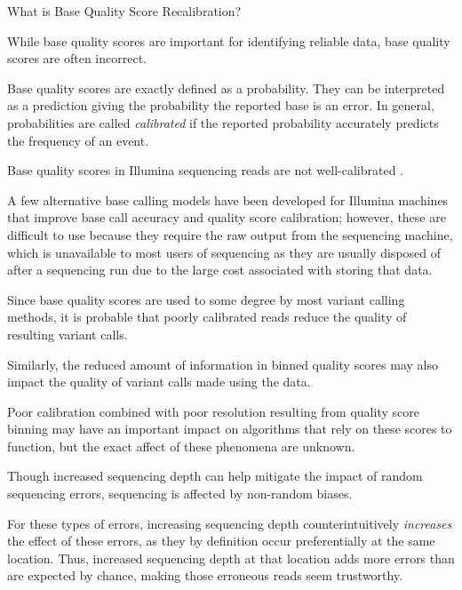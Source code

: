 \documentclass{article}
\begin{document}
\begin{outline}
	\item What is Base Quality Score Recalibration?
	\begin{outline}
		\item While base quality scores are important for identifying reliable data, base quality scores are often incorrect.
		\item Base quality scores are exactly defined as a probability. They can be interpreted as a prediction giving the probability the reported base is an error. In general, probabilities are called \textit{calibrated} if the reported probability accurately predicts the frequency of an event.
		\item Base quality scores in Illumina sequencing reads are not well-calibrated \parencite{callahan_dada2:_2016}. %
		\item A few alternative base calling models have been developed for Illumina machines that improve base call accuracy and quality score calibration; however, these are difficult to use because they require the raw output from the sequencing machine, which is unavailable to most users of sequencing as they are usually disposed of after a sequencing run due to the large cost associated with storing that data. %
		\item Since base quality scores are used to some degree by most variant calling methods, it is probable that poorly calibrated reads reduce the quality of resulting variant calls.
		\item Similarly, the reduced amount of information in binned quality scores may also impact the quality of variant calls made using the data.
		\item Poor calibration combined with poor resolution resulting from quality score binning may have an important impact on algorithms that rely on these scores to function, but the exact affect of these phenomena are unknown.
		\item Though increased sequencing depth can help mitigate the impact of random sequencing errors, sequencing is affected by non-random biases. %
		\item For these types of errors, increasing sequencing depth counterintuitively \textit{increases} the effect of these errors, as they by definition occur preferentially at the same location. Thus, increased sequencing depth at that location adds more errors than are expected by chance, making those erroneous reads seem trustworthy. 

\end{outline}
\end{outline}
\end{document}
